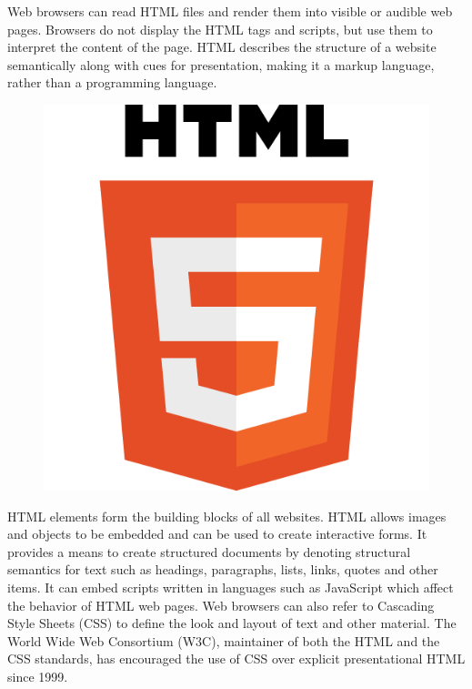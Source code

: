 Web browsers can read HTML files and render them into visible or audible web pages. Browsers do not display the HTML tags and scripts, but use them to interpret the content of the page. HTML describes the structure of a website semantically along with cues for presentation, making it a markup language, rather than a programming language.
\newline
\begin{figure}[h]
	\centering
	\includegraphics[width=0.4\linewidth]{images/HTML5_Logo_512}
	\label{fig:html-logo}
\end{figure}
HTML elements form the building blocks of all websites. HTML allows images and objects to be embedded and can be used to create interactive forms. It provides a means to create structured documents by denoting structural semantics for text such as headings, paragraphs, lists, links, quotes and other items. It can embed scripts written in languages such as JavaScript which affect the behavior of HTML web pages.
Web browsers can also refer to Cascading Style Sheets (CSS) to define the look and layout of text and other material. The World Wide Web Consortium (W3C), maintainer of both the HTML and the CSS standards, has encouraged the use of CSS over explicit presentational HTML since 1999.

